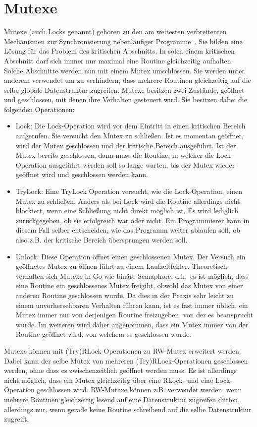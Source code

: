 \section{Mutexe}\label{Chap:Back-Sec:Mutex}
Mutexe (auch Locks genannt) gehören zu den am weitesten verbreitenten Mechanismen 
zur Synchronisierung nebenläufiger Programme~\cite{Undead}. Sie bilden 
eine Lösung für das Problem des kritischen Abschnitts. In solch einem 
kritischen Abschnitt darf sich immer nur maximal eine Routine gleichzeitig
aufhalten. Solche Abschnitte werden nun mit einem Mutex umschlossen. 
Sie werden unter anderem verwendet um zu verhindern, dass 
mehrere Routinen gleichzeitig auf die selbe globale Datenstruktur 
zugreifen. Mutexe besitzen zwei Zustände, geöffnet und geschlossen, mit denen 
ihre Verhalten gesteuert wird.
Sie besitzen dabei die folgenden Operationen:
\begin{itemize}
  \item Lock: Die Lock-Operation wird vor dem Eintritt in einen kritischen 
    Bereich aufgerufen. Sie versucht den Mutex zu schließen. Ist es momentan 
    geöffnet, wird der Mutex geschlossen und der kritische
    Bereich ausgeführt. Ist der Mutex bereits geschlossen, dann muss 
    die Routine, in welcher die Lock-Operation ausgeführt 
    werden soll so lange warten, bis der Mutex wieder geöffnet wird und 
    geschlossen werden kann.
  \item TryLock: Eine TryLock Operation versucht, wie die Lock-Operation,
    einen Mutex zu schließen. Anders als bei Lock wird die Routine allerdings 
    nicht blockiert, wenn eine Schließung nicht direkt möglich ist. Es wird 
    lediglich zurückgegeben, ob sie erfolgreich war oder nicht. Ein Programmierer 
    kann in diesem Fall selber entscheiden, wie das Programm weiter ablaufen 
    soll, ob also z.B. der kritische Bereich übersprungen werden soll.
  \item Unlock: Diese Operation öffnet einen geschlossenen Mutex. Der Versuch ein 
    geöffnetes Mutex zu öffnen führt zu einem Laufzeitfehler. 
    Theoretisch verhalten sich Mutexe in Go wie binäre Semaphore, d.h.~es ist möglich, 
    dass eine Routine ein 
    geschlossenes Mutex freigibt, obwohl das Mutex von einer anderen Routine
    geschlossen wurde. Da dies in der Praxis sehr leicht zu einem 
    unvorhersehbaren Verhalten führen kann, ist es fast immer üblich, 
    ein Mutex immer nur von derjenigen Routine freizugeben, von der es beansprucht wurde. 
    Im weiteren wird daher angenommen, 
    dass ein Mutex immer von der Routine geöffnet wird, von welchem es 
    geschlossen wurde.
\end{itemize}
Mutexe können mit (Try)RLock Operationen zu RW-Mutex erweitert werden.
Dabei kann der selbe Mutex von mehreren 
(Try)RLock-Operationen geschlossen werden, ohne dass es zwischenzeitlich
geöffnet werden muss. Es ist allerdings 
nicht möglich, dass ein Mutex gleichzeitig über eine RLock- und eine Lock-Operation 
geschlossen wird. RW-Mutexe können z.B. verwendet werden, wenn mehrere Routinen 
gleichzeitig lesend auf eine Datenstruktur zugreifen dürfen, allerdings nur, 
wenn gerade keine Routine schreibend auf die selbe Datenstruktur zugreift.


